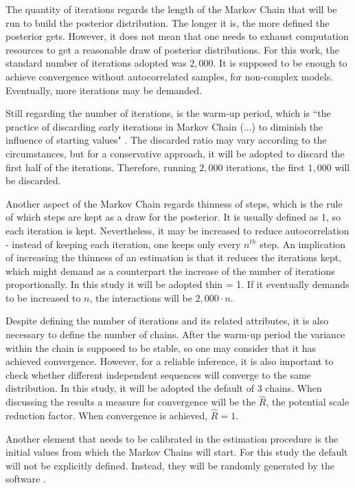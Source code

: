 The quantity of iterations regards the length of the Markov Chain that will be run to build the posterior distribution. The longer it is, the more defined the posterior gets. However, it does not mean that one needs to exhaust computation resources to get a reasonable draw of posterior distributions. For this work, the standard number of iterations adopted was $2,000$. It is supposed to be enough to achieve convergence without autocorrelated samples, for non-complex models. Eventually, more iterations may be demanded.

Still regarding the number of iterations, is the warm-up period, which is ``the practice of discarding early iterations in Markov Chain (...) to diminish the influence of starting values" \citep{gelman2014}. The discarded ratio may vary according to the circumstances, but for a conservative approach, it will be adopted to discard the first half of the iterations. Therefore, running $2,000$ iterations, the first $1,000$ will be discarded.

Another aspect of the Markov Chain regards thinness of steps, which is the rule of which steps are kept as a draw for the posterior. It is usually defined as 1, so each iteration is kept. Nevertheless, it may be increased to reduce autocorrelation \citep{kruschke2011} - instead of keeping each iteration, one keeps only every $n^{th}$ step. An implication of increasing the thinness of an estimation is that it reduces the iterations kept, which might demand as a counterpart the increase of the number of iterations proportionally. In this study it will be adopted thin = 1. If it eventually demands to be increased to $n$, the interactions will be $2,000 \cdot n$.

Despite defining the number of iterations and its related attributes, it is also necessary to define the number of chains. After the warm-up period the variance within the chain is supposed to be stable, so one may consider that it has achieved convergence. However, for a reliable inference, it is also important to check whether different independent sequences will converge to the same distribution. In this study, it will be adopted the default of 3 chains. When discussing the results a measure for convergence will be the $\hat{R}$, the potential scale reduction factor. When convergence is achieved, $\hat{R}=1$.

Another element that needs to be calibrated in the estimation procedure is the initial values from which the Markov Chains will start. For this study the default will not be explicitly defined. Instead, they will be randomly generated by the software \citep{stan-manual}.

